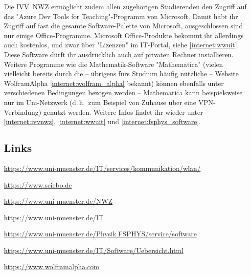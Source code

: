 \begin{multicols}{2}
Die IVV~NWZ ermöglicht zudem allen zugehörigen Studierenden den Zugriff auf das "Azure Dev Tools for Teaching"-Programm von Microsoft.
Damit habt ihr Zugriff auf fast die gesamte Software-Palette von Microsoft, ausgeschlossen sind nur einige Office-Programme. 
Microsoft Office-Produkte bekommt ihr allerdings auch kostenlos, und zwar über "Lizenzen" im IT-Portal, siehe \cref{internet:wwuit}.
Diese Software dürft ihr ausdrücklich auch auf privaten Rechner installieren.
Weitere Programme wie die Mathematik-Software "Mathematica" (vielen vielleicht bereits durch die -- übrigens fürs Studium häufig nützliche -- Website WolframAlpha \cref{internet:wolfram_alpha} bekannt) können ebenfalls unter verschiedenen Bedingungen bezogen werden -- Mathematica kann beispielsweise nur im Uni-Netzwerk (d.\,h.\ zum Beispiel von Zuhause über eine VPN-Verbindung) genutzt werden.
Weitere Infos findet ihr wieder unter \cref{internet:ivvnwz}, \cref{internet:wwuit} und \cref{internet:fsphys_software}.

\subsection{Links}
\begin{flushleft}
	\begin{fibelurl}
		\url{https://www.uni-muenster.de/IT/services/kommunikation/wlan/}
		\label{internet:wlan}
	\end{fibelurl}
	\begin{fibelurl}
		\url{https://www.sciebo.de}
		\label{internet:sciebo}
	\end{fibelurl}
	\begin{fibelurl}
		\url{https://www.uni-muenster.de/NWZ}
		\label{internet:ivvnwz}
	\end{fibelurl}
	\begin{fibelurl}
		\url{https://www.uni-muenster.de/IT}
		\label{internet:wwuit}
	\end{fibelurl}
	\begin{fibelurl}
		\url{https://www.uni-muenster.de/Physik.FSPHYS/service/software}
		\label{internet:fsphys_software}
	\end{fibelurl}
	\begin{fibelurl}
		\url{https://www.uni-muenster.de/IT/Software/Uebersicht.html}
		\label{internet:wwuit_software}
	\end{fibelurl}
	\begin{fibelurl}
		\url{https://www.wolframalpha.com}
		\label{internet:wolfram_alpha}
	\end{fibelurl}
\end{flushleft}


\end{multicols}

